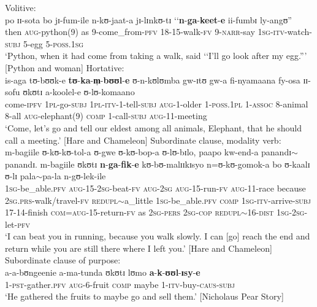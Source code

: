 \begin{exe}
\ex Volitive:\\
\gll po ɪɪ-sota bo jɪ-fum-ile n-kʊ-jaat-a jɪ-lɪnkʊ-tɪ \textup{\lq\lq}\textbf{n}-\textbf{ga}-\textbf{keet}-\textbf{e} ii-fumbɪ ly-angʊ\textup{''}\\
then \textsc{aug}-python(9) as 9-come\_from-\textsc{pfv} 18-15-walk-\textsc{fv} 9-\textsc{narr}-say \phantom{\lq\lq}\textsc{1sg}-\textsc{itv}-watch-\textsc{subj} 5-egg 5-\textsc{poss.1sg}\\
\glt \lq Python, when it had come from taking a walk, said \lq\lq I'll go look after my egg.''{}' [Python and woman]
\ex Hortative:\\
\gll is-aga tʊ-bʊʊk-e \textbf{tʊ}-\textbf{ka}-\textbf{m̩}-\textbf{bʊʊl}-\textbf{e} ʊ-n-kʊlʊmba gw-ɪtʊ gw-a fi-nyamaana fy-osa ɪɪ-sofu ʊkʊtɪ a-koolel-e ʊ-lʊ-komaano\\
come-\textsc{ipfv} \textsc{1pl}-go-\textsc{subj} \textsc{1pl}-\textsc{itv}-1-tell-\textsc{subj} \textsc{aug}-1-older 1-\textsc{poss.1pl} 1-\textsc{assoc} 8-animal 8-all \textsc{aug}-elephant(9) \textsc{comp} 1-call-\textsc{subj} \textsc{aug}-11-meeting\\
\glt `Come, let's go and tell our eldest among all animals, Elephant, that he should call a meeting.' [Hare and Chameleon]
\ex Subordinate clause, modality verb: \label{exDistalKaSubordinateAbility}\\
\gll m-bagiile ʊ-kʊ-kʊ-tol-a ʊ-gwe ʊ-kʊ-bop-a ʊ-lʊ-bɪlo, paapo kw-end-a panandɪ$\sim$panandɪ. m-bagiile ʊkʊtɪ \textbf{n}-\textbf{ga}-\textbf{fik}-\textbf{e} kʊ-bʊ-malɪɪkɪsyo n=ʊ-kʊ-gomok-a bo ʊ-kaalɪ ʊ-lɪ pala$\sim$pa-la n-gʊ-lek-ile\\
\textsc{1sg}-be\_able.\textsc{pfv} \textsc{aug}-15-\textsc{2sg}-beat-\textsc{fv} \textsc{aug}-\textsc{2sg} \textsc{aug}-15-run-\textsc{fv} \textsc{aug}-11-race because \textsc{2sg.prs}-walk/travel-\textsc{fv} \textsc{redupl}$\sim$a\_little \textsc{1sg}-be\_able.\textsc{pfv} \textsc{comp} \textsc{1sg}-\textsc{itv}-arrive-\textsc{subj} 17-14-finish \textsc{com}=\textsc{aug}-15-return-\textsc{fv} as \textsc{2sg}-\textsc{pers} \textsc{2sg}-\textsc{cop} \textsc{redupl}$\sim$16-\textsc{dist} \textsc{1sg}-\textsc{2sg}-let-\textsc{pfv}\\ 
\glt `I can beat you in running, because you walk slowly. I can [go] reach the end and return while you are still there where I left you.' [Hare and Chameleon] 
\ex Subordinate clause of purpose:\label{exDistalOhneBuuka2}\\
\gll a-a-bʊngeenie a-ma-tunda ʊkʊtɪ lʊmo \textbf{a}-\textbf{k}-\textbf{ʊʊl}-\textbf{ɪsy}-\textbf{e}\\
1-\textsc{pst}-gather.\textsc{pfv} \textsc{aug}-6-fruit \textsc{comp} maybe 1-\textsc{itv}-buy-\textsc{caus}-\textsc{subj}\\ 
\glt `He gathered the fruits to maybe go and sell them.' [Nicholaus Pear Story]
\end{exe}

